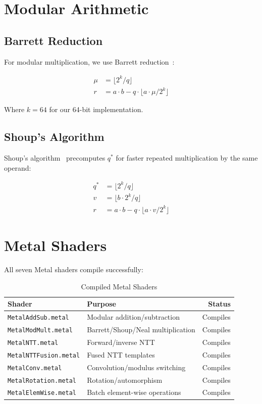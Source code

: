 \documentclass[11pt,oneside]{article}
\begin{document}
\section{Modular Arithmetic}

\subsection{Barrett Reduction}

For modular multiplication, we use Barrett reduction~\cite{barrett1986computing}:

\begin{align}
\mu &= \lfloor 2^k / q \rfloor \\
r &= a \cdot b - q \cdot \lfloor a \cdot \mu / 2^k \rfloor
\end{align}

Where $k=64$ for our 64-bit implementation.

\subsection{Shoup's Algorithm}

Shoup's algorithm~\cite{shoup1996efficient} precomputes $q^*$ for faster repeated multiplication by the same operand:

\begin{align}
q^* &= \lfloor 2^k / q \rfloor \\
v &= \lfloor b \cdot 2^k / q \rfloor \\
r &= a \cdot b - q \cdot \lfloor a \cdot v / 2^k \rfloor
\end{align}

\section{Metal Shaders}

All seven Metal shaders compile successfully:

\begin{table}[h]
\centering
\caption{Compiled Metal Shaders}
\begin{tabular}{llr}
\toprule
Shader & Purpose & Status \\
\midrule
\texttt{MetalAddSub.metal} & Modular addition/subtraction & Compiles \\
\texttt{MetalModMult.metal} & Barrett/Shoup/Neal multiplication & Compiles \\
\texttt{MetalNTT.metal} & Forward/inverse NTT & Compiles \\
\texttt{MetalNTTFusion.metal} & Fused NTT templates & Compiles \\
\texttt{MetalConv.metal} & Convolution/modulus switching & Compiles \\
\texttt{MetalRotation.metal} & Rotation/automorphism & Compiles \\
\texttt{MetalElemWise.metal} & Batch element-wise operations & Compiles \\
\bottomrule
\end{tabular}
\end{table}
\end{document}
